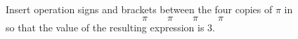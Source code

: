 Insert operation signs and brackets between the four copies of $\pi$ in
\[\pi\qquad\pi\qquad\pi\qquad\pi\]
so that the value of the resulting expression is $3$.
